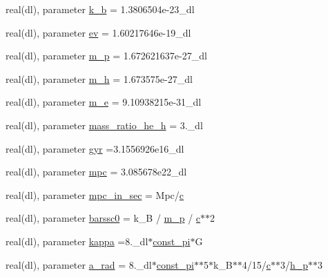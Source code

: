 \begin{DoxyCompactItemize}
real(dl), parameter \mbox{\hyperlink{namespaceconstants_a5beb5fedefa5380e9fb06e6bd8a16d43}{k\+\_\+b}} = 1.\+3806504e-\/23\+\_\+dl
\item 
real(dl), parameter \mbox{\hyperlink{namespaceconstants_addbb41b1f5963fd51db70e3dced89700}{ev}} = 1.\+60217646e-\/19\+\_\+dl
\item 
real(dl), parameter \mbox{\hyperlink{namespaceconstants_af32db00e3c1473bdccb379fea19b3921}{m\+\_\+p}} = 1.\+672621637e-\/27\+\_\+dl
\item 
real(dl), parameter \mbox{\hyperlink{namespaceconstants_a0246217a8783fa2adbd3bba601bfb7fb}{m\+\_\+h}} = 1.\+673575e-\/27\+\_\+dl
\item 
real(dl), parameter \mbox{\hyperlink{namespaceconstants_a9337199d9a72664967dbaf4132e99266}{m\+\_\+e}} = 9.\+10938215e-\/31\+\_\+dl
\item 
real(dl), parameter \mbox{\hyperlink{namespaceconstants_af8b29ede25f97b7cd054d486d8bf649c}{mass\+\_\+ratio\+\_\+he\+\_\+h}} = 3.\+\_\+dl
\item 
real(dl), parameter \mbox{\hyperlink{namespaceconstants_a6b6035602c42bfffde2ac46fd0c0ae0c}{gyr}} =3.\+1556926e16\+\_\+dl
\item 
real(dl), parameter \mbox{\hyperlink{namespaceconstants_a8375c8f64af8b53668cecd9e5c58fea2}{mpc}} = 3.\+085678e22\+\_\+dl
\item 
real(dl), parameter \mbox{\hyperlink{namespaceconstants_ab60f94607e30c3b961f91dce9248e2bd}{mpc\+\_\+in\+\_\+sec}} = Mpc/\mbox{\hyperlink{namespaceconstants_acf9c352e48b37fa8a9aff3e5957246b8}{c}}
\item 
real(dl), parameter \mbox{\hyperlink{namespaceconstants_a849ef8cb73f59304fa5e01297f4d040d}{barssc0}} = k\+\_\+B / \mbox{\hyperlink{namespaceconstants_af32db00e3c1473bdccb379fea19b3921}{m\+\_\+p}} / \mbox{\hyperlink{namespaceconstants_acf9c352e48b37fa8a9aff3e5957246b8}{c}}$\ast$$\ast$2
\item 
real(dl), parameter \mbox{\hyperlink{namespaceconstants_a1c51ffffcc61d146e0a27d8340cba5c3}{kappa}} =8.\+\_\+dl$\ast$\mbox{\hyperlink{namespaceconstants_ae6b5af15d3fb28a3dba468486c548447}{const\+\_\+pi}}$\ast$G
\item 
real(dl), parameter \mbox{\hyperlink{namespaceconstants_a8930b886e85c5c95942db45cb3485fbe}{a\+\_\+rad}} = 8.\+\_\+dl$\ast$\mbox{\hyperlink{namespaceconstants_ae6b5af15d3fb28a3dba468486c548447}{const\+\_\+pi}}$\ast$$\ast$5$\ast$k\+\_\+B$\ast$$\ast$4/15/\mbox{\hyperlink{namespaceconstants_acf9c352e48b37fa8a9aff3e5957246b8}{c}}$\ast$$\ast$3/\mbox{\hyperlink{namespaceconstants_a3bfcfec5bb3ae395c9384035afa3ff0b}{h\+\_\+p}}$\ast$$\ast$3
$$
\end{DoxyCompactItemize}

